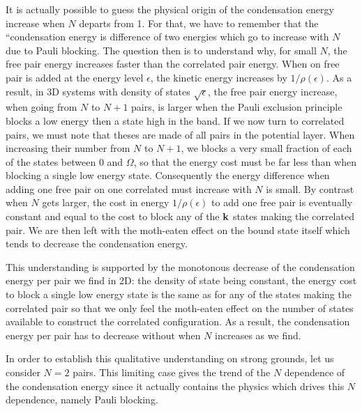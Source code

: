 \documentclass{article}
\begin{document}
It is actually possible to guess the physical origin of the condensation energy increase when $N$ departs from 1.  For that, we have to remember that the ``condensation energy is difference of two energies which go to increase with $N$ due to Pauli blocking.  The question then is to understand why, for small $N$, the free pair energy increases faster than the correlated pair energy.  When on free pair is added at the energy level $\epsilon$, the kinetic energy increases by $1/\rho(\epsilon)$.  As a result, in 3D systems with density of states $\sqrt{\epsilon}$, the free pair energy increase, when going from $N$ to $N+1$ pairs, is larger when the Pauli exclusion principle blocks a low energy then a state high in the band.  If we now turn to correlated pairs, we must note that theses are made of all pairs in the potential layer. When increasing their number from $N$ to $N+1$, we blocks a very small fraction of each of the states between $0$ and $\Omega$, so that the energy cost must be far less than when blocking a single low energy state.  Consequently the energy difference when adding one free pair on one correlated must increase with $N$ is small. By contrast when $N$ gets larger, the cost in energy $1/\rho(\epsilon)$ to add one free pair is eventually constant and equal to the cost to block any of the $\mathbf{k}$ states making the correlated pair.  We are then left with the moth-eaten effect on the bound state itself which tends to decrease the condensation energy. 

This understanding is supported by the monotonous decrease of the condensation energy per pair we find in 2D: the density of state being constant, the energy cost to block a single low energy state is the same as for any of the states making the correlated pair so that we only feel the moth-eaten effect on the number of states available to construct the correlated configuration.  As a result, the condensation energy per pair has to decrease without when $N$ increases as we find.  

In order to establish this qualitative understanding on strong grounds, let us consider $N=2$ pairs. This limiting case gives the trend of the $N$ dependence of the condensation energy since it actually contains the physics which drives this $N$ dependence, namely Pauli blocking.  
\end{document}
